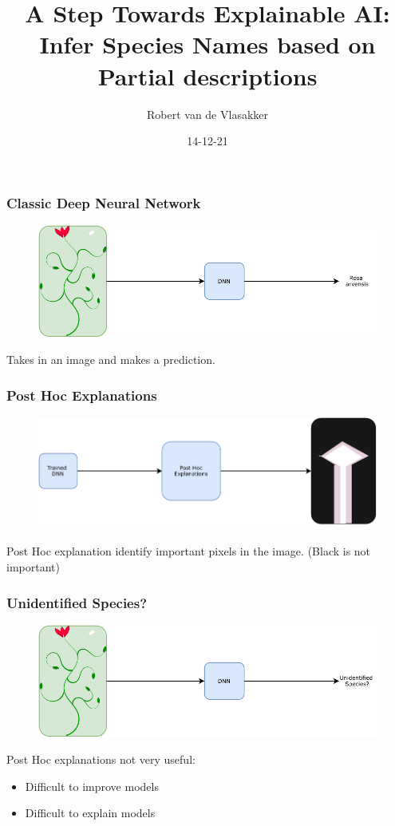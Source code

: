 \documentclass{beamer}
\title{A Step Towards Explainable AI: Infer Species Names based on Partial descriptions}
\author{Robert van de Vlasakker}
\institute{Wageningen University \& Research}
\date{14-12-21}
\begin{document}
\graphicspath{ {./figures/} }

\frame{\titlepage}

\begin{frame}
\frametitle{Classic Deep Neural Network}
\begin{figure} [htbp]
    \centering
    \includegraphics[width=\textwidth]{figures/midterm_explain_1.pdf}
\end{figure}

Takes in an image and makes a prediction.

\end{frame}

\begin{frame}
\frametitle{Post Hoc Explanations}
\begin{figure} [htbp]
    \centering
    \includegraphics[width=\textwidth]{figures/midterm_explain_2.pdf}
\end{figure}
Post Hoc explanation identify important pixels in the image.
(Black is not important)
\end{frame}


\begin{frame}
\frametitle{Unidentified Species?}
\begin{figure} [htbp]
    \centering
    \includegraphics[width=\textwidth]{figures/midterm_explain_3.pdf}
\end{figure}
Post Hoc explanations not very useful:
\begin{itemize}
    \item Difficult to improve models
    \item Difficult to explain models
\end{itemize}
\end{frame}
\end{document}
